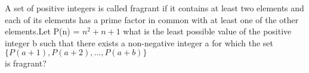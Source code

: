 
\item A set of positive integers is called fragrant if it contains at least two elements and each of its elements has a prime factor in common with at least one of the other elements.Let P(n) = $n^2 + n + 1$
what is the least possible value of the positive integer b such that there exists a non-negative integer a for which the set\\
$\{P(a+1),P(a+2),...,P(a+b)\}$\\
is fragrant?
